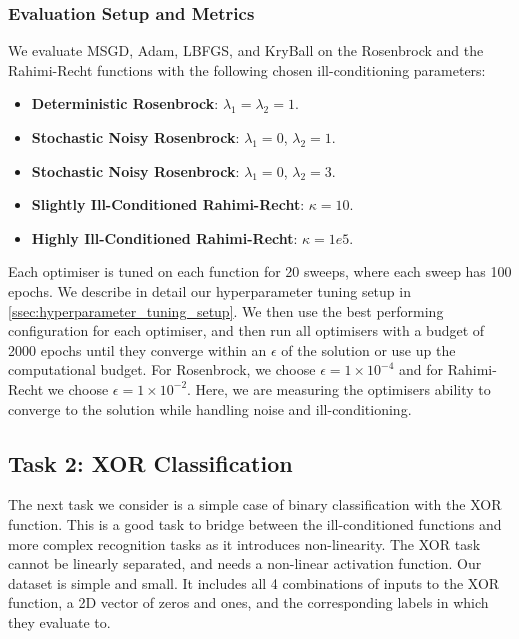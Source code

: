 \subsubsection{Evaluation Setup and Metrics}
\label{sssec:task_1_evaluation_setup_and_metrics}
We evaluate MSGD, Adam, LBFGS, and KryBall on the Rosenbrock and the Rahimi-Recht functions with the following chosen ill-conditioning parameters:
\begin{itemize}
    \item \textbf{Deterministic Rosenbrock}: $\lambda_1 = \lambda_2 = 1$.
    \item \textbf{Stochastic Noisy Rosenbrock}: $\lambda_1 = 0$, $\lambda_2 = 1$.
    \item \textbf{Stochastic Noisy Rosenbrock}: $\lambda_1 = 0$, $\lambda_2 = 3$.
    \item \textbf{Slightly Ill-Conditioned Rahimi-Recht}: $\kappa = 10$.
    \item \textbf{Highly Ill-Conditioned Rahimi-Recht}: $\kappa = 1e5$.
\end{itemize}
Each optimiser is tuned on each function for 20 sweeps, where each sweep has 100 epochs. We describe in detail our hyperparameter tuning setup in \cref{ssec:hyperparameter_tuning_setup}. We then use the best performing configuration for each optimiser, and then run all optimisers with a budget of 2000 epochs until they converge within an $\epsilon$ of the solution or use up the computational budget. For Rosenbrock, we choose $\epsilon = 1 \times 10^{-4}$ and for Rahimi-Recht we choose $\epsilon = 1 \times 10^{-2}$. Here, we are measuring the optimisers ability to converge to the solution while handling noise and ill-conditioning.

\subsection{Task 2: XOR Classification}
\label{ssec:task_2_xor_classification}

The next task we consider is a simple case of binary classification with the XOR function. This is a good task to bridge between the ill-conditioned functions and more complex recognition tasks as it introduces non-linearity. The XOR task cannot be linearly separated, and needs a non-linear activation function. Our dataset is simple and small. It includes all 4 combinations of inputs to the XOR function, a 2D vector of zeros and ones, and the corresponding labels in which they evaluate to.

